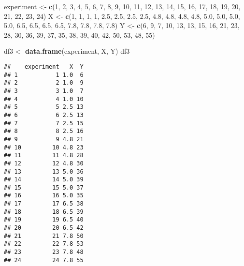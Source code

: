 \documentclass[
]{article}
\newenvironment{Shaded}{\begin{snugshade}}{\end{snugshade}}
\newcommand{\DecValTok}[1]{\textcolor[rgb]{0.00,0.00,0.81}{#1}}
\newcommand{\FloatTok}[1]{\textcolor[rgb]{0.00,0.00,0.81}{#1}}
\newcommand{\KeywordTok}[1]{\textcolor[rgb]{0.13,0.29,0.53}{\textbf{#1}}}
\newcommand{\NormalTok}[1]{#1}
\newcommand{\StringTok}[1]{\textcolor[rgb]{0.31,0.60,0.02}{#1}}
\begin{document}
\begin{Shaded}
\begin{Highlighting}[]
\NormalTok{experiment <-}\StringTok{ }\KeywordTok{c}\NormalTok{(}\DecValTok{1}\NormalTok{, }\DecValTok{2}\NormalTok{, }\DecValTok{3}\NormalTok{, }\DecValTok{4}\NormalTok{, }\DecValTok{5}\NormalTok{, }\DecValTok{6}\NormalTok{, }\DecValTok{7}\NormalTok{, }\DecValTok{8}\NormalTok{, }\DecValTok{9}\NormalTok{, }\DecValTok{10}\NormalTok{, }\DecValTok{11}\NormalTok{, }\DecValTok{12}\NormalTok{, }\DecValTok{13}\NormalTok{, }\DecValTok{14}\NormalTok{, }\DecValTok{15}\NormalTok{, }\DecValTok{16}\NormalTok{, }\DecValTok{17}\NormalTok{, }\DecValTok{18}\NormalTok{, }\DecValTok{19}\NormalTok{, }\DecValTok{20}\NormalTok{, }\DecValTok{21}\NormalTok{, }\DecValTok{22}\NormalTok{, }\DecValTok{23}\NormalTok{, }\DecValTok{24}\NormalTok{)}
\NormalTok{X <-}\StringTok{ }\KeywordTok{c}\NormalTok{(}\DecValTok{1}\NormalTok{, }\DecValTok{1}\NormalTok{, }\DecValTok{1}\NormalTok{, }\DecValTok{1}\NormalTok{, }\FloatTok{2.5}\NormalTok{, }\FloatTok{2.5}\NormalTok{, }\FloatTok{2.5}\NormalTok{, }\FloatTok{2.5}\NormalTok{, }\FloatTok{4.8}\NormalTok{, }\FloatTok{4.8}\NormalTok{, }\FloatTok{4.8}\NormalTok{, }\FloatTok{4.8}\NormalTok{, }\FloatTok{5.0}\NormalTok{, }\FloatTok{5.0}\NormalTok{, }\FloatTok{5.0}\NormalTok{, }\FloatTok{5.0}\NormalTok{, }\FloatTok{6.5}\NormalTok{, }\FloatTok{6.5}\NormalTok{, }\FloatTok{6.5}\NormalTok{, }\FloatTok{6.5}\NormalTok{, }\FloatTok{7.8}\NormalTok{, }\FloatTok{7.8}\NormalTok{, }\FloatTok{7.8}\NormalTok{, }\FloatTok{7.8}\NormalTok{)}
\NormalTok{Y <-}\StringTok{ }\KeywordTok{c}\NormalTok{(}\DecValTok{6}\NormalTok{, }\DecValTok{9}\NormalTok{, }\DecValTok{7}\NormalTok{, }\DecValTok{10}\NormalTok{, }\DecValTok{13}\NormalTok{, }\DecValTok{13}\NormalTok{, }\DecValTok{15}\NormalTok{, }\DecValTok{16}\NormalTok{, }\DecValTok{21}\NormalTok{, }\DecValTok{23}\NormalTok{, }\DecValTok{28}\NormalTok{, }\DecValTok{30}\NormalTok{, }\DecValTok{36}\NormalTok{, }\DecValTok{39}\NormalTok{, }\DecValTok{37}\NormalTok{, }\DecValTok{35}\NormalTok{, }\DecValTok{38}\NormalTok{, }\DecValTok{39}\NormalTok{, }\DecValTok{40}\NormalTok{, }\DecValTok{42}\NormalTok{, }\DecValTok{50}\NormalTok{, }\DecValTok{53}\NormalTok{, }\DecValTok{48}\NormalTok{, }\DecValTok{55}\NormalTok{)}

\NormalTok{df3 <-}\StringTok{ }\KeywordTok{data.frame}\NormalTok{(experiment, X, Y)}
\NormalTok{df3}
\end{Highlighting}
\end{Shaded}

\begin{verbatim}
##    experiment   X  Y
## 1           1 1.0  6
## 2           2 1.0  9
## 3           3 1.0  7
## 4           4 1.0 10
## 5           5 2.5 13
## 6           6 2.5 13
## 7           7 2.5 15
## 8           8 2.5 16
## 9           9 4.8 21
## 10         10 4.8 23
## 11         11 4.8 28
## 12         12 4.8 30
## 13         13 5.0 36
## 14         14 5.0 39
## 15         15 5.0 37
## 16         16 5.0 35
## 17         17 6.5 38
## 18         18 6.5 39
## 19         19 6.5 40
## 20         20 6.5 42
## 21         21 7.8 50
## 22         22 7.8 53
## 23         23 7.8 48
## 24         24 7.8 55
\end{verbatim}
\end{document}

